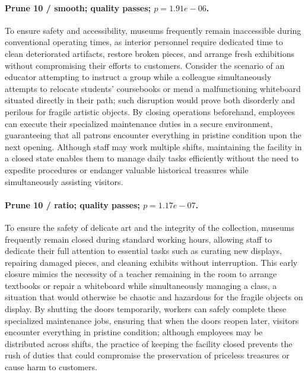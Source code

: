 \paragraph{Prune 10 / smooth; quality passes; $p=1.91e-06$.} To ensure safety and accessibility, museums frequently remain inaccessible during conventional operating times, as interior personnel require dedicated time to clean deteriorated artifacts, restore broken pieces, and arrange fresh exhibitions without compromising their efforts to customers. Consider the scenario of an educator attempting to instruct a group while a colleague simultaneously attempts to relocate students' coursebooks or mend a malfunctioning whiteboard situated directly in their path; such disruption would prove both disorderly and perilous for fragile artistic objects. By closing operations beforehand, employees can execute their specialized maintenance duties in a secure environment, guaranteeing that all patrons encounter everything in pristine condition upon the next opening. Although staff may work multiple shifts, maintaining the facility in a closed state enables them to manage daily tasks efficiently without the need to expedite procedures or endanger valuable historical treasures while simultaneously assisting visitors.

\paragraph{Prune 10 / ratio; quality passes; $p=1.17e-07$.} To ensure the safety of delicate art and the integrity of the collection, museums frequently remain closed during standard working hours, allowing staff to dedicate their full attention to essential tasks such as curating new displays, repairing damaged pieces, and cleaning exhibits without interruption. This early closure mimics the necessity of a teacher remaining in the room to arrange textbooks or repair a whiteboard while simultaneously managing a class, a situation that would otherwise be chaotic and hazardous for the fragile objects on display. By shutting the doors temporarily, workers can safely complete these specialized maintenance jobs, ensuring that when the doors reopen later, visitors encounter everything in pristine condition; although employees may be distributed across shifts, the practice of keeping the facility closed prevents the rush of duties that could compromise the preservation of priceless treasures or cause harm to customers.

